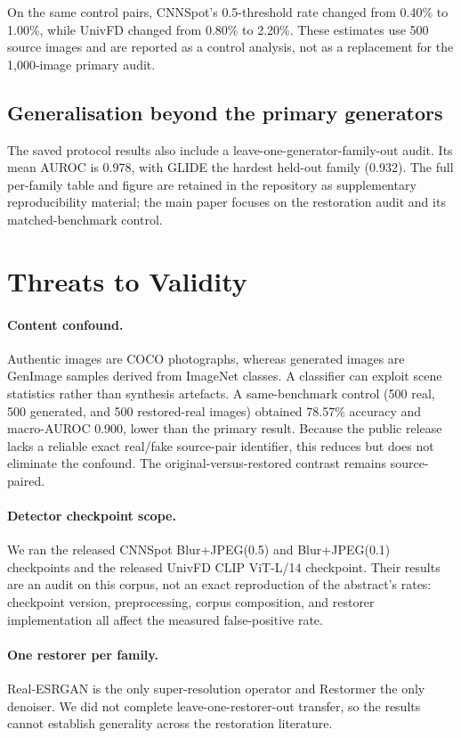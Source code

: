 ﻿\documentclass[graybox,norunningheads]{svmult}
\begin{document}
On the same control pairs, CNNSpot's 0.5-threshold rate changed from 0.40\% to
1.00\%, while UnivFD changed from 0.80\% to 2.20\%. These estimates use 500
source images and are reported as a control analysis, not as a replacement for
the 1,000-image primary audit.

\subsection{Generalisation beyond the primary generators}

The saved protocol results also include a leave-one-generator-family-out audit.
Its mean AUROC is 0.978, with GLIDE the hardest held-out family (0.932). The
full per-family table and figure are retained in the repository as supplementary
reproducibility material; the main paper focuses on the restoration audit and
its matched-benchmark control.

\section{Threats to Validity}
\label{sec:threats}

\paragraph{Content confound.} Authentic images are COCO photographs, whereas
generated images are GenImage samples derived from ImageNet classes. A classifier
can exploit scene statistics rather than synthesis artefacts. A same-benchmark
control (500 real, 500 generated, and 500 restored-real images) obtained 78.57\%
accuracy and macro-AUROC 0.900, lower than the primary result. Because the public
release lacks a reliable exact real/fake source-pair identifier, this reduces but
does not eliminate the confound. The original-versus-restored contrast remains
source-paired.

\paragraph{Detector checkpoint scope.} We ran the released CNNSpot Blur+JPEG(0.5)
and Blur+JPEG(0.1) checkpoints and the released UnivFD CLIP ViT-L/14 checkpoint.
Their results are an audit on this corpus, not an exact reproduction of the
abstract's rates: checkpoint version, preprocessing, corpus composition, and
restorer implementation all affect the measured false-positive rate.

\paragraph{One restorer per family.} Real-ESRGAN is the only super-resolution
operator and Restormer the only denoiser. We did not complete leave-one-restorer-out
transfer, so the results cannot establish generality across the restoration literature.
\end{document}
